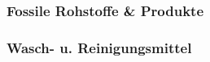 \documentclass[../document.tex]{subfiles}
\begin{document}
\subsubsection{Fossile Rohstoffe \& Produkte}

\subsubsection{Wasch- u. Reinigungsmittel}
\end{document}
